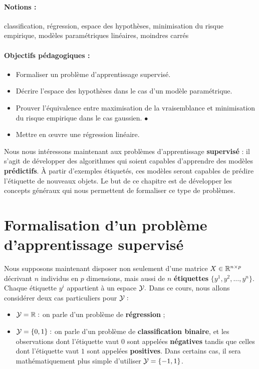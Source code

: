 \label{chap:erm}

\paragraph{Notions :} classification, régression, espace des hypothèses,
minimisation du risque empirique, modèles paramétriques
linéaires, moindres carrés
\paragraph{Objectifs pédagogiques :} 
\begin{itemize}      
  \setlength{\itemsep}{3pt}
\item Formaliser un problème d'apprentissage supervisé.
\item Décrire l'espace des hypothèses dans le cas d'un modèle paramétrique.
\item Prouver l'équivalence entre maximisation de la vraisemblance et
  minimisation du risque empirique dans le cas gaussien. $\bullet$ 
\item Mettre en \oe{}uvre une régression linéaire.
\end{itemize}

Nous nous intéressons maintenant aux problèmes d'apprentissage \textbf{supervisé}
: il s'agit de développer des algorithmes qui soient capables d'apprendre des
modèles \textbf{prédictifs}. À partir d'exemples étiquetés, ces modèles seront
capables de prédire l'étiquette de nouveaux objets. Le but de ce chapitre est
de développer les concepts généraux qui nous permettent de formaliser ce type
de problèmes.

\section{Formalisation d'un problème d'apprentissage supervisé}
\label{sec:sup_learn}
Nous supposons maintenant disposer non seulement d'une matrice
$X \in \mathbb{R}^{n \times p}$ décrivant $n$ individus en $p$ dimensions, mais aussi
de $n$ \textbf{étiquettes} $\{y^1, y^2, \dots, y^n\}$. Chaque étiquette $y^i$
appartient à un espace $\mathcal{Y}.$ Dans ce cours, nous allons considérer deux cas
particuliers pour $\mathcal{Y}:$
\begin{itemize}
\item $\mathcal{Y} = \mathbb{R} :$ on parle d'un problème de \textbf{régression} ;
\item $\mathcal{Y} = \lbrace 0, 1 \rbrace :$ on parle d'un problème de \textbf{classification
    binaire}, et les observations dont l'étiquette vaut $0$ sont appelées
  \textbf{négatives} tandis que celles dont l'étiquette vaut $1$ sont appelées
  \textbf{positives}. Dans certains cas, il sera mathématiquement plus simple
  d'utiliser $\mathcal{Y} = \lbrace -1, 1 \rbrace$.
\end{itemize}

